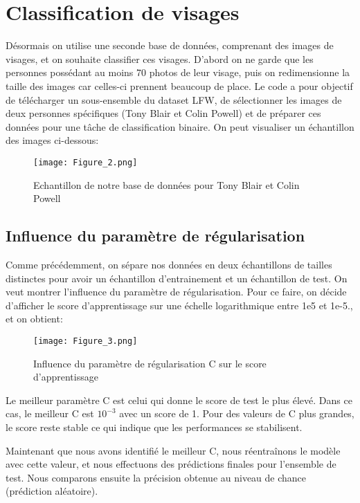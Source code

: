 \documentclass{article}
\begin{document}
\section{Classification de visages}

Désormais on utilise une seconde base de données, comprenant des images de visages, et on souhaite classifier ces visages. D'abord on ne garde que les personnes possédant au moins 70 photos de leur visage, puis on redimensionne la taille des images car celles-ci prennent beaucoup de place.  
Le code a pour objectif de télécharger un sous-ensemble du dataset LFW, de sélectionner les images de deux personnes spécifiques (Tony Blair et Colin Powell) et de préparer ces données pour une tâche de classification binaire.
On peut visualiser un échantillon des images ci-dessous:

\begin{figure}[H]
    \centering
    \texttt{[image: Figure\_2.png]}
    \caption{Echantillon de notre base de données pour Tony Blair et Colin Powell}
    \label{fig:enter-label}
\end{figure}
\newpage
\subsection{Influence du paramètre de régularisation}

Comme précédemment, on sépare nos données en deux échantillons de tailles distinctes pour avoir un échantillon d'entrainement et un échantillon de test. On veut montrer l'influence du paramètre de régularisation. Pour ce faire, on décide d'afficher le score d'apprentissage sur une échelle logarithmique entre 1e5 et 1e-5., et on obtient:

\begin{figure}[H]
    \centering
    \texttt{[image: Figure\_3.png]}
    \caption{Influence du paramètre de régularisation C sur le score d'apprentissage}
    \label{fig:enter-label}
\end{figure}

Le meilleur paramètre C est celui qui donne le score de test le plus élevé.
Dans ce cas, le meilleur C est $10^{-3}$ avec un score de 1. Pour des valeurs de C plus grandes, le score reste stable ce qui indique que les performances se stabilisent.

Maintenant que nous avons identifié le meilleur C, nous réentraînons le modèle avec cette valeur, et nous effectuons des prédictions finales pour l'ensemble de test. Nous comparons ensuite la précision obtenue au niveau de chance (prédiction aléatoire).
\end{document}
